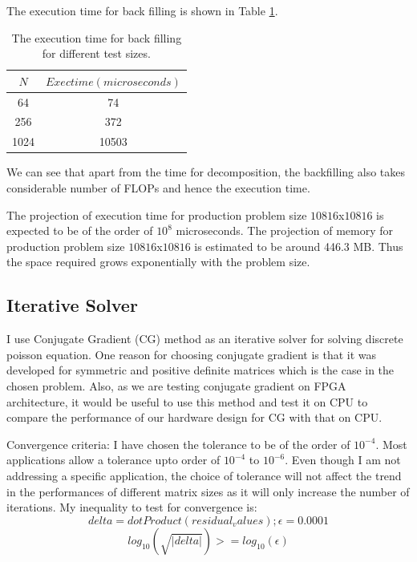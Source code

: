 \documentclass{article}
\begin{document}
\begin{spacing}{1.1}
The execution time for back filling is shown in Table \ref{backfill_direct}.

\begin{table}[H]
\begin{center}
 \begin{tabular}{| c | c |} 
 \hline
$N$ & $Exec time (microseconds)$ \\ %
 \hline
64 & 74  \\ %
256 &  372 \\ %
1024 &  10503  \\ %
 \hline
\end{tabular}%
\end{center}
\caption{\label{backfill_direct} The execution time for back filling for different test sizes.  } 
\end{table}

We can see that apart from the time for decomposition, the backfilling also takes considerable number of FLOPs and hence the execution time. 

The projection of execution time for production problem size $10816$x$10816$ is expected to be of the order of $10^8$ microseconds. The projection of memory for production problem size $10816$x$10816$ is estimated to be around 446.3 MB. Thus the space required grows exponentially with the problem size.


\subsection{Iterative Solver}

I use Conjugate Gradient (CG) method as an iterative solver for solving discrete poisson equation. One reason for choosing conjugate gradient is that it was developed for symmetric and positive definite matrices which is the case in the chosen problem. Also, as we are testing conjugate gradient on FPGA architecture, it would be useful to use this method and test it on CPU to compare the performance of our hardware design for CG with that on CPU.

Convergence criteria: I have chosen the tolerance to be of the order of $10^{-4}$. Most applications allow a tolerance upto order of $10^{-4}$ to $10^{-6}$. Even though I am not addressing a specific application, the choice of tolerance will not affect the trend in the performances of different matrix sizes as it will only increase the number of iterations. My inequality to test for convergence is:
\[ delta = dotProduct(residual_values); \epsilon = 0.0001 \]
\[ log_{10}(\sqrt{|delta|}) >= log_{10}(\epsilon) \]



\end{spacing}
\end{document}
